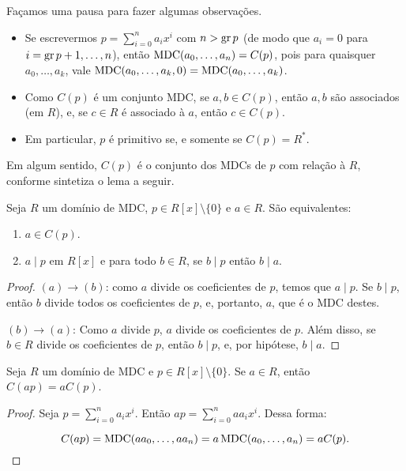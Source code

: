     Façamos uma pausa para fazer algumas observações.
    
    \begin{itemize}
        \item Se escrevermos $p=\sum_{i=0}^n a_i x^i$ com $n>\operatorname{gr} p$ (de modo que $a_i=0$ para $i=\operatorname{gr} p+1, \dots, n$), então $\operatorname{MDC}(a_0, \dots, a_n)=C(p)$, pois para quaisquer $a_0, \dots, a_k$, vale $\operatorname{MDC}(a_0, \dots, a_k, 0)=\operatorname{MDC}(a_0, \dots, a_k)$.
        \item Como $C(p)$ é um conjunto MDC, se $a, b \in C(p)$, então $a, b$ são associados (em $R$), e, se $c\in R$ é associado à $a$, então $c\in C(p)$.
        \item Em particular, $p$ é primitivo se, e somente se $C(p)=R^*$.
    \end{itemize}

    Em algum sentido, $C(p)$ é o conjunto dos MDCs de $p$ com relação à $R$, conforme sintetiza o lema a seguir.

    \begin{lemma}
        Seja $R$ um domínio de MDC, $p \in R[x]\setminus\{0\}$ e $a\in R$. São equivalentes:
        \begin{enumerate}[label=(\alph*)]
            \item $a\in C(p)$.
            \item $a\mid p$ em $R[x]$ e para todo $b \in R$, se $b\mid p$ então $b\mid a$.
        \end{enumerate}
    \end{lemma}
    \begin{proof}
        $(a)\rightarrow (b)$: como $a$ divide os coeficientes de $p$, temos que $a\mid p$. Se $b\mid p$, então $b$ divide todos os coeficientes de $p$, e, portanto, $a$, que é o MDC destes.

        $(b)\rightarrow (a)$: Como $a$ divide $p$, $a$ divide os coeficientes de $p$. Além disso, se $b\in R$ divide os coeficientes de $p$, então $b\mid p$, e, por hipótese, $b\mid a$.
    \end{proof}


    \begin{lemma}
        Seja $R$ um domínio de MDC e $p \in R[x]\setminus\{0\}$. Se $a\in R$, então $C(ap)=aC(p)$.
    \end{lemma}
    \begin{proof}
        Seja $p=\sum_{i=0}^n a_i x^i$. Então $ap=\sum_{i=0}^n aa_i x^i$.
        Dessa forma:
        
        \begin{equation*}
            C(ap)=\operatorname{MDC}(aa_0, \dots, aa_n)=a\operatorname{MDC}(a_0, \dots, a_n)=aC(p).
        \end{equation*}
    \end{proof}
    
